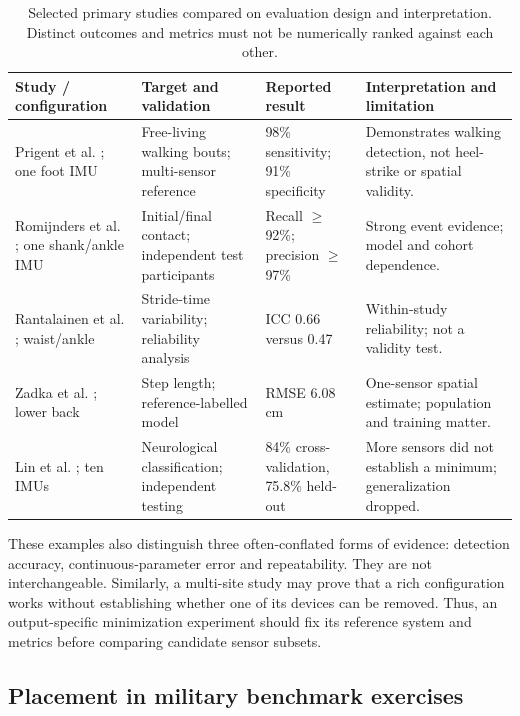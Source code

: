 \documentclass[10pt,a4paper,twocolumn]{article}
\renewcommand{\arraystretch}{1.1}
\begin{document}
\begin{table}[!t]
 \centering\footnotesize
 \caption{Selected primary studies compared on evaluation design and interpretation. Distinct outcomes and metrics must not be numerically ranked against each other.}
 \label{tab:study-comparison}
 \renewcommand{\arraystretch}{1.14}
 \begin{tabularx}{\linewidth}{@{}p{2.15cm}p{1.6cm}YY@{}}
 \toprule
 Study / configuration & Target and validation & Reported result & Interpretation and limitation \\
 \midrule
 Prigent et al. \citep{prigent2023}; one foot IMU & Free-living walking bouts; multi-sensor reference & 98\% sensitivity; 91\% specificity & Demonstrates walking detection, not heel-strike or spatial validity. \\
 Romijnders et al. \citep{romijnders2022}; one shank/ankle IMU & Initial/final contact; independent test participants & Recall $\geq$92\%; precision $\geq$97\% & Strong event evidence; model and cohort dependence. \\
 Rantalainen et al. \citep{rantalainen2020}; waist/ankle & Stride-time variability; reliability analysis & ICC 0.66 versus 0.47 & Within-study reliability; not a validity test. \\
 Zadka et al. \citep{zadka2024}; lower back & Step length; reference-labelled model & RMSE 6.08\,cm & One-sensor spatial estimate; population and training matter. \\
 Lin et al. \citep{lin2023}; ten IMUs & Neurological classification; independent testing & 84\% cross-validation, 75.8\% held-out & More sensors did not establish a minimum; generalization dropped. \\
 \bottomrule
 \end{tabularx}
\end{table}

These examples also distinguish three often-conflated forms of evidence: detection accuracy, continuous-parameter error and repeatability. They are not interchangeable. Similarly, a multi-site study may prove that a rich configuration works without establishing whether one of its devices can be removed. Thus, an output-specific minimization experiment should fix its reference system and metrics before comparing candidate sensor subsets.

\subsection{Placement in military benchmark exercises}
\label{sec:placement-military}
\end{document}
